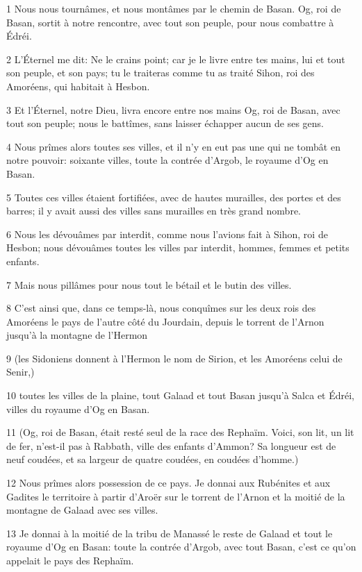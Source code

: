 \par 1 Nous nous tournâmes, et nous montâmes par le chemin de Basan. Og, roi de Basan, sortit à notre rencontre, avec tout son peuple, pour nous combattre à Édréi.
\par 2 L'Éternel me dit: Ne le crains point; car je le livre entre tes mains, lui et tout son peuple, et son pays; tu le traiteras comme tu as traité Sihon, roi des Amoréens, qui habitait à Hesbon.
\par 3 Et l'Éternel, notre Dieu, livra encore entre nos mains Og, roi de Basan, avec tout son peuple; nous le battîmes, sans laisser échapper aucun de ses gens.
\par 4 Nous prîmes alors toutes ses villes, et il n'y en eut pas une qui ne tombât en notre pouvoir: soixante villes, toute la contrée d'Argob, le royaume d'Og en Basan.
\par 5 Toutes ces villes étaient fortifiées, avec de hautes murailles, des portes et des barres; il y avait aussi des villes sans murailles en très grand nombre.
\par 6 Nous les dévouâmes par interdit, comme nous l'avions fait à Sihon, roi de Hesbon; nous dévouâmes toutes les villes par interdit, hommes, femmes et petits enfants.
\par 7 Mais nous pillâmes pour nous tout le bétail et le butin des villes.
\par 8 C'est ainsi que, dans ce temps-là, nous conquîmes sur les deux rois des Amoréens le pays de l'autre côté du Jourdain, depuis le torrent de l'Arnon jusqu'à la montagne de l'Hermon
\par 9 (les Sidoniens donnent à l'Hermon le nom de Sirion, et les Amoréens celui de Senir,)
\par 10 toutes les villes de la plaine, tout Galaad et tout Basan jusqu'à Salca et Édréi, villes du royaume d'Og en Basan.
\par 11 (Og, roi de Basan, était resté seul de la race des Rephaïm. Voici, son lit, un lit de fer, n'est-il pas à Rabbath, ville des enfants d'Ammon? Sa longueur est de neuf coudées, et sa largeur de quatre coudées, en coudées d'homme.)
\par 12 Nous prîmes alors possession de ce pays. Je donnai aux Rubénites et aux Gadites le territoire à partir d'Aroër sur le torrent de l'Arnon et la moitié de la montagne de Galaad avec ses villes.
\par 13 Je donnai à la moitié de la tribu de Manassé le reste de Galaad et tout le royaume d'Og en Basan: toute la contrée d'Argob, avec tout Basan, c'est ce qu'on appelait le pays des Rephaïm.
